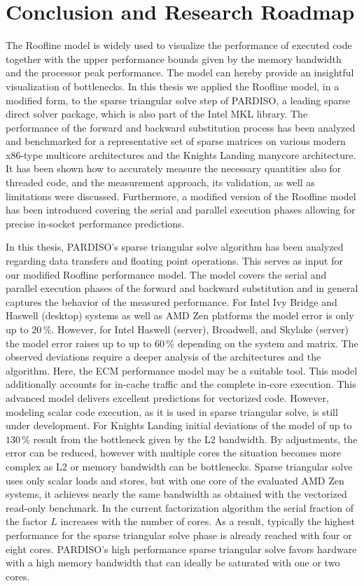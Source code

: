 \chapter{Conclusion and Research Roadmap}
\label{sec:conclusion}

The Roofline model is widely used to visualize the performance of executed code together with the upper performance bounds given by the memory bandwidth and the processor peak performance. The model can hereby provide an insightful visualization of bottlenecks. In this thesis we applied the Roofline model, in a modified form, to the sparse triangular solve step of PARDISO, a leading sparse direct solver package, which is also part of the Intel MKL library. The performance of the forward and backward substitution process has been analyzed and benchmarked for a representative set of sparse matrices on various modern x86-type multicore architectures and the Knights Landing manycore architecture. It has been shown how to accurately measure the necessary quantities also for threaded code, and the measurement approach, its validation, as well as limitations were discussed. Furthermore, a modified version of the Roofline model has been introduced covering the serial and parallel execution phases allowing for precise in-socket performance predictions.

In this thesis, PARDISO's sparse triangular solve algorithm has been analyzed regarding data transfers and floating point operations. This serves as input for our modified Roofline performance model. The model covers the serial and parallel execution phases of the forward and backward substitution and in general captures the behavior of the measured
performance. For Intel Ivy Bridge and Haswell (desktop) systems as well as AMD Zen platforms the model error is only up to $20$\,\%. However, for Intel Haswell (server), Broadwell, and Skylake (server) the model error raises up to up to $60$\,\% depending on the system and matrix. The observed deviations require a deeper analysis
of the architectures and the algorithm. Here, the ECM performance
model may be a suitable tool. This model additionally accounts for in-cache traffic and the complete in-core execution. This advanced model delivers excellent predictions for vectorized code. However, modeling scalar code execution, as it is used in sparse triangular solve, is still under development. For Knights Landing initial deviations of the model
of up to $130$\,\% result from the bottleneck given by the L2 bandwidth.
By adjustments, the error can be reduced, however with multiple cores the situation becomes more complex as L2 or memory bandwidth can be bottlenecks. Sparse triangular solve uses only scalar loads and stores, but with one core of the evaluated AMD Zen systems, it achieves nearly the same bandwidth as obtained with the vectorized read-only benchmark. In the current factorization algorithm the serial fraction of the factor $L$
increases with the number of cores. As a result, typically the highest performance for the sparse triangular solve phase is already reached with four or eight cores.
PARDISO's high performance sparse triangular solve favors hardware with a high
memory bandwidth that can ideally be saturated with one or two cores.

